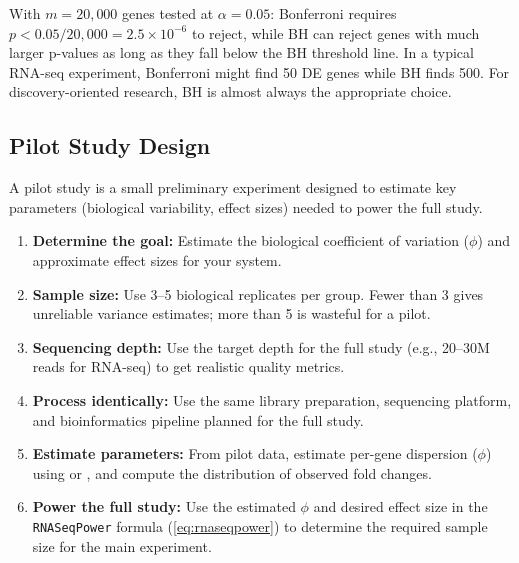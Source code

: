 \begin{warningbox}[title={Bonferroni vs BH: When It Matters}]
With $m = 20{,}000$ genes tested at $\alpha = 0.05$: Bonferroni requires $p < 0.05 / 20{,}000 = 2.5 \times 10^{-6}$ to reject, while BH can reject genes with much larger p-values as long as they fall below the BH threshold line. In a typical RNA-seq experiment, Bonferroni might find 50 DE genes while BH finds 500. For discovery-oriented research, BH is almost always the appropriate choice.
\end{warningbox}

\subsection{Pilot Study Design}
\label{subsec:expdesign:pilot}

A pilot study is a small preliminary experiment designed to estimate key parameters (biological variability, effect sizes) needed to power the full study.

\begin{protocolbox}[title={Designing a Pilot Study}]
\begin{enumerate}[itemsep=3pt]
  \item \textbf{Determine the goal:} Estimate the biological coefficient of variation ($\phi$) and approximate effect sizes for your system.
  \item \textbf{Sample size:} Use 3--5 biological replicates per group. Fewer than 3 gives unreliable variance estimates; more than 5 is wasteful for a pilot.
  \item \textbf{Sequencing depth:} Use the target depth for the full study (e.g., 20--30M reads for RNA-seq) to get realistic quality metrics.
  \item \textbf{Process identically:} Use the same library preparation, sequencing platform, and bioinformatics pipeline planned for the full study.
  \item \textbf{Estimate parameters:} From pilot data, estimate per-gene dispersion ($\phi$) using  or , and compute the distribution of observed fold changes.
  \item \textbf{Power the full study:} Use the estimated $\phi$ and desired effect size in the \texttt{RNASeqPower} formula (\cref{eq:rnaseqpower}) to determine the required sample size for the main experiment.
\end{enumerate}
\end{protocolbox}

